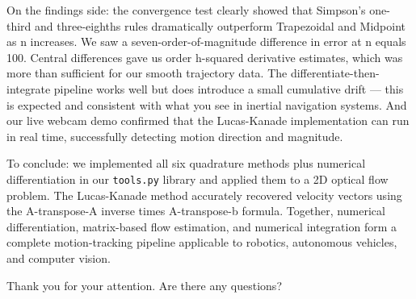 \documentclass[a4paper,landscape,12pt]{extarticle}
\begin{document}
\begin{huge}
{On the findings side: the convergence test clearly showed that Simpson's one-third and three-eighths rules dramatically outperform Trapezoidal and Midpoint as n increases. We saw a seven-order-of-magnitude difference in error at n equals 100. Central differences gave us order h-squared derivative estimates, which was more than sufficient for our smooth trajectory data. The differentiate-then-integrate pipeline works well but does introduce a small cumulative drift --- this is expected and consistent with what you see in inertial navigation systems. And our live webcam demo confirmed that the Lucas-Kanade implementation can run in real time, successfully detecting motion direction and magnitude.

To conclude: we implemented all six quadrature methods plus numerical differentiation in our \texttt{tools.py} library and applied them to a 2D optical flow problem. The Lucas-Kanade method accurately recovered velocity vectors using the A-transpose-A inverse times A-transpose-b formula. Together, numerical differentiation, matrix-based flow estimation, and numerical integration form a complete motion-tracking pipeline applicable to robotics, autonomous vehicles, and computer vision.

Thank you for your attention. Are there any questions?
}

\end{huge}
\end{document}
